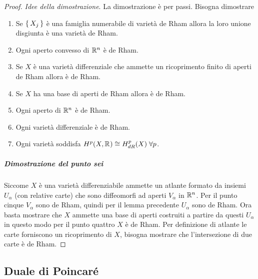 \begin{proof} \emph{Idee della dimostrazione}.
  La dimostrazione è per passi. Bisogna dimostrare
  \begin{enumerate}
  \item Se $ \set{X_j} $ è una famiglia numerabile di varietà de Rham
    allora la loro unione disgiunta è una varietà de Rham.
  \item Ogni aperto convesso di $ \mathbb{R}^{n} $ è de Rham.
  \item Se $ X $ è una varietà differenziale che ammette un ricoprimento
    finito di aperti de Rham allora è de Rham.
  \item Se $ X $ ha una base di aperti de Rham allora è de Rham.
  \item Ogni aperto di $ \mathbb{R}^{n} $ è de Rham.
  \item Ogni varietà differenziale è de Rham.
  \item Ogni varietà soddisfa $  H^p(X, \mathbb{R}^{}) \cong H^p_{dR}(X) \; \forall p $.
  \end{enumerate}

  \subparagraph{Dimostrazione del punto sei} Siccome $ X $ è una varietà
  differenziabile ammette un atlante formato da insiemi $ U_\alpha $ (con relative
  carte) che sono diffeomorfi ad aperti $ V_\alpha $ in $ \mathbb{R}^{n} $. Per il punto
  cinque $ V_\alpha $ sono de Rham, quindi per il lemma precedente $ U_\alpha $ sono
  de Rham. Ora basta mostrare che $ X $ ammette una base di aperti costruiti
  a partire da questi $ U_\alpha $ in questo modo per il punto quattro $ X $ è de
  Rham. Per definizione di atlante le carte forniscono un ricoprimento di $ X $,
  bisogna mostrare che l'intersezione di due carte è de Rham.
\end{proof}

\subsection{Duale di Poincaré}

